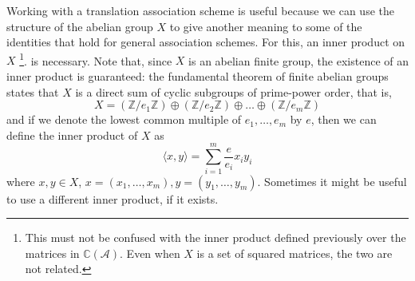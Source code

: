 \documentclass[a4paper,12pt]{article}
\theoremstyle{plain}
\theoremstyle{definition}
\theoremstyle{remark}
\begin{document}
\begin{comment}
We will consider $ G = GL(n,q) $, that is, the set of non-singular $ n \times
n $ matrices over $ M_n(\mathbb{F}_{q}) $. First we check that $ G $ satisfies the
previous hypothesis:
\begin{enumerate}[label=(\alph*)]
    \item For any $ S \in GL(n,q) $, it is clear that $ S0 = 0 $.
    \item For any $ S \in GL(n,q) $ and any matrices $ A,B $, it holds
        that:
        \[ S(A+B) = SA + SB \]
    \item For any matrix $ A $, it is immediate that $ rank(A) = rank(-A) $.
\end{enumerate}
Now we will show that the orbits of the action of $ G $ over an additive group
of matrices in $ M_n(\mathbb{F}_{q}) $ do in fact partition the matrices
according to their rank. Suppose two matrices $ A,B $ have rank $ r $. Then,
there are $ r $ columns in both $ A $ and $ B $ that are linearly independent.
Let $ (i_1, \dots, i_r) $ and $ (j_1, \dots, j_r) $ be the indexes of these
columns of A and B, respectively. There is a basis change matrix, $ M_A $, such
that $ a_{i_k} = M_A e_{i_k} $, where $ a_{i_k} $ is the corresponding column of
$ A $ and $ e_{i_k} $ is the corresponding cannonical basis vector. There is an
analog matrix $ M_B $ such that $ e_{j_k} = M_B b_{j_k} $. Let $ P $ be the
permutation matrix that brings the columns in $ (j_1, \dots, j_r) $ to the
columns in $ (i_1, \dots, i_r ) $. Then, we have that
\[ A = (M_A^{-1} P M_B) B \]
where $ S := M_A^{-1} P M_B \in GL(n,q) $.

\end{comment}

Working with a translation association scheme is useful because we can use the
structure of the abelian group $ X $ to give another meaning to some of the
identities that hold for general association schemes. For this, an inner product
on $ X $
\footnote{This must not be confused with the inner product defined previously
over the matrices in $ \mathbb{C}(\mathcal{A}) $. Even when $ X $ is a set of
squared matrices, the two are not related.}.
is necessary. Note that, since $ X $ is an abelian finite group, the existence
of an inner product is guaranteed: the fundamental theorem of finite abelian
groups states that $ X $ is a direct sum of cyclic subgroups of prime-power order,
that is,
\[
    X = ( \mathbb{Z} / e_1\mathbb{Z} ) \oplus ( \mathbb{Z} / e_2\mathbb{Z} )
    \oplus \dots \oplus ( \mathbb{Z} / e_m\mathbb{Z} )
\]
and if we denote the lowest common multiple of $ e_1, \dots, e_m $ by $ e $, then we
can define the inner product of $ X $ as
\[ \langle x,y \rangle = \sum_{ i=1 }^{ m } \frac{e}{e_i} x_i y_i \]
where $ x, y \in X $, $ x = (x_1,\dots,x_m), y = (y_1, \dots, y_m) $. Sometimes
it might be useful to use a different inner product, if it exists.
\end{document}
